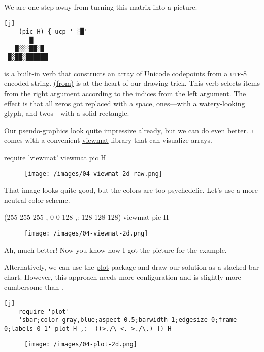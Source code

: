 \documentclass{article}
\begin{document}
We are one step away from turning this matrix into a picture.

\begin{verbatim}[j]
    (pic H) { ucp ' ░█'
       █
   █░░░██░█
 █░██░██████
\end{verbatim}

 is a built-in verb that constructs an array of Unicode codepoints from a \textsc{utf}-8 encoded string.
\href{https://code.jsoftware.com/wiki/Vocabulary/curlylf#dyadic}{\code{\{} (from)} is at the heart of our drawing trick.
This verb selects items from the right argument according to the indices from the left argument.
The effect is that all zeros got replaced with a space, ones---with a watery-looking glyph, and twos---with a solid rectangle.

\label{viewmat}
Our pseudo-graphics look quite impressive already, but we can do even better.
\textsc{j} comes with a convenient \href{https://code.jsoftware.com/wiki/Studio/Viewmat}{viewmat} library that can visualize arrays.

\begin{code}[j]
    require 'viewmat'
    viewmat pic H
\end{code}

\begin{figure}
   \texttt{[image: /images/04-viewmat-2d-raw.png]}
\end{figure}

That image looks quite good, but the colors are too psychedelic.
Let's use a more neutral color scheme.

\begin{code}[j]
    (255 255 255 , 0 0 128 ,: 128 128 128) viewmat pic H
\end{code}

\begin{figure}
   \texttt{[image: /images/04-viewmat-2d.png]}
\end{figure}

Ah, much better!
Now you know how I got the picture for the example.

Alternatively, we can use the \href{https://code.jsoftware.com/wiki/Plot}{plot} package and draw our solution as a stacked bar chart.
However, this approach needs more configuration and is slightly more cumbersome than .

\begin{verbatim}[j]
    require 'plot'
    'sbar;color gray,blue;aspect 0.5;barwidth 1;edgesize 0;frame 0;labels 0 1' plot H ,:  ((>./\ <. >./\.)-]) H
\end{verbatim}
\begin{figure}
    \texttt{[image: /images/04-plot-2d.png]}
\end{figure}
\end{document}
